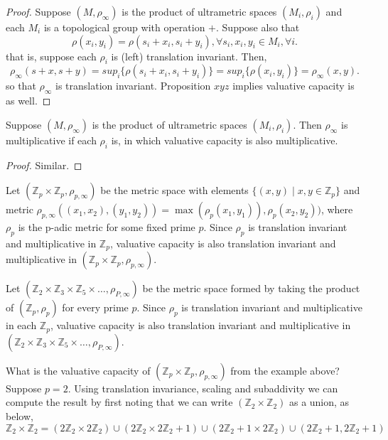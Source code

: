 \begin{proof}
Suppose $(M,\rho_\infty)$ is the product of ultrametric spaces $(M_i, \rho_i)$ and each $M_i$ is a topological group with operation $+$. Suppose also that \[\rho(x_i,y_i) = \rho(s_i + x_i, s_i +y_i), \forall s_i, x_i, y_i \in M_i, \forall i.\] that is, suppose each $\rho_i$ is (left) translation invariant. Then,  
\[
\rho_\infty(s +x, s+y)  
= sup_i\{\rho(s_i +x_i, s_i + y_i)\} 
= sup_i\{\rho(x_i, y_i)\}
= \rho_\infty(x,y).
\] so that $\rho_\infty$ is translation invariant.  Proposition $xyz$ implies valuative capacity is as well. 
\end{proof}


\begin{proposition*}
Suppose $(M,\rho_\infty)$ is the product of ultrametric spaces $(M_i, \rho_i)$. Then $\rho_\infty$ is multiplicative if each $\rho_i$ is, in which valuative capacity is also multiplicative.
\end{proposition*}

\begin{proof}
Similar.
\end{proof}

\begin{example}
	Let $(\mathbb{Z}_p \times \mathbb{Z}_p, \rho_{p,\infty})$ be the metric space with elements $\{(x,y)\mid x,y \in \mathbb{Z}_p\}$ and metric $\rho_{p,\infty}((x_1,x_2), (y_1,y_2)) = \max(\rho_p(x_1, y_1)), \rho_p(x_2, y_2))$, where $\rho_p$ is the p-adic metric for some fixed prime $p$. Since $\rho_p$ is translation invariant and multiplicative in $\mathbb{Z}_p$, valuative capacity is also translation invariant and multiplicative in  $(\mathbb{Z}_p \times \mathbb{Z}_p, \rho_{p,\infty})$.
\end{example}


\begin{example}
	Let $(\mathbb{Z}_2 \times \mathbb{Z}_3 \times \mathbb{Z}_5 \times \ldots, \rho_{P,\infty})$ be the metric space formed by taking the product of $(\mathbb{Z}_p, \rho_p)$ for every prime $p$. Since $\rho_p$ is translation invariant and multiplicative in each $\mathbb{Z}_p$, valuative capacity is also translation invariant and multiplicative in  $(\mathbb{Z}_2 \times \mathbb{Z}_3 \times \mathbb{Z}_5 \times \ldots, \rho_{P,\infty})$.
\end{example}


What is the valuative capacity of  $(\mathbb{Z}_p \times \mathbb{Z}_p, \rho_{p,\infty})$  from the example above? Suppose $p=2$.  Using translation invariance, scaling and subaddivity we can compute the result by first noting that we can write $(\mathbb{Z}_2 \times \mathbb{Z}_2)$ as a union, as below,
\[
\mathbb{Z}_2 \times \mathbb{Z}_2 = (2\mathbb{Z}_2 \times 2\mathbb{Z}_2) \cup (2\mathbb{Z}_2 \times 2\mathbb{Z}_2 +1) \cup (2\mathbb{Z}_2+1 \times 2\mathbb{Z}_2) \cup (2\mathbb{Z}_2+1, 2\mathbb{Z}_2+1)
\]

